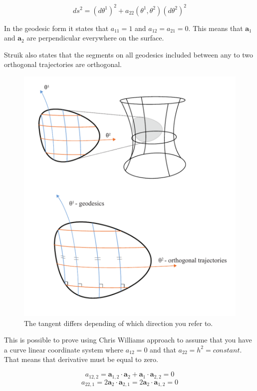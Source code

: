\begin{equation}\label{geodesicForm}
    ds^2 = (d\theta^1)^2 + a_{22}(\theta^1,\theta^2)(d\theta^2)^2
\end{equation}

In the geodesic form it states that $a_{11} = 1$ and $a_{12}=a_{21} = 0$. This means that $\textbf{a}_1$ and $\textbf{a}_2$ are perpendicular everywhere on the surface. 

Struik also states that the segments  on all geodesics included  between any to two orthogonal  trajectories are orthogonal.


\begin{figure}[H]
\centering
\includegraphics[height=0.8\linewidth ]{figure/Theory/SurfGeodesics.pdf}
\caption{The tangent differs depending of which direction you refer to. }
\end{figure}

This is possible to prove using Chris Williams approach to assume that you have a curve linear coordinate system where $a_{12} = 0$ and that $a_{22} = h^2 = constant$. That means that derivative must be equal to zero.

\begin{equation}
a_{12,2} = \textbf{a}_{1,2} \cdot \textbf{a}_2 + \textbf{a}_1 \cdot \textbf{a}_{2,2} = 0
\end{equation}
\begin{equation}
a_{22,1} = 2\textbf{a}_{2} \cdot \textbf{a}_{2,1} = 2\textbf{a}_{2} \cdot \textbf{a}_{1,2} = 0
\end{equation}

